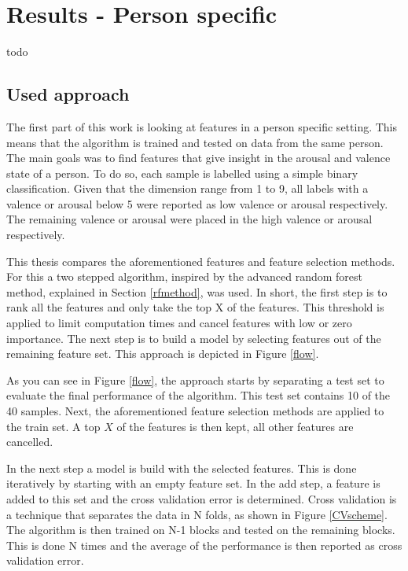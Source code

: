 \chapter{Results - Person specific}
{\samenvatting todo}

\section{Used approach}
\label{approach}

The first part of this work is looking at features in a person specific setting. This means that the algorithm is trained and tested on data from the same person. The main goals was to find features that give insight in the arousal and valence state of a person. To do so, each sample is labelled using a simple binary classification. Given that the dimension range from 1 to 9, all labels with a valence or arousal below 5 were reported as low valence or arousal respectively. The remaining valence or arousal were placed in the high valence or arousal respectively.

\npar

This thesis compares the aforementioned features and feature selection methods. For this a two stepped algorithm, inspired by the advanced random forest method, explained in Section \ref{rfmethod}, was used. In short, the first step is to rank all the features and only take the top X of the features. This threshold is applied to limit computation times and cancel features with low or zero importance. The next step is to build a model by selecting features out of the remaining feature set. This approach is depicted in Figure \ref{flow}.


As you can see in Figure \ref{flow}, the approach starts by separating a test set to evaluate the final performance of the algorithm. This test set contains 10 of the 40 samples. Next, the aforementioned feature selection methods are applied to the train set. A top $X$ of the features is then kept, all other features are cancelled.

\npar

In the next step a model is build with the selected features. This is done iteratively by starting with an empty feature set. In the add step, a feature is added to this set and the cross validation error is determined. Cross validation is a technique that separates the data in N folds, as shown in Figure \ref{CVscheme}. The algorithm is then trained on N-1 blocks and tested on the remaining blocks. This is done N times and the average of the performance is then reported as cross validation error. 

